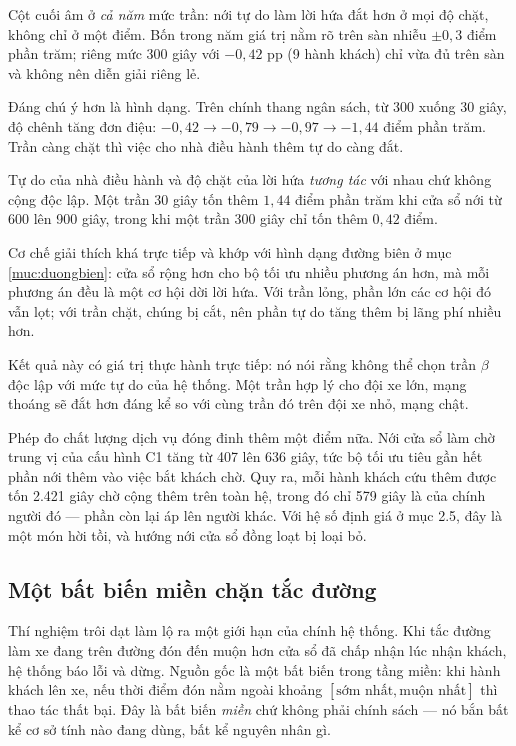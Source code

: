 Cột cuối âm ở \emph{cả năm} mức trần: nới tự do làm lời hứa đắt hơn ở mọi độ chặt, không chỉ ở
một điểm. Bốn trong năm giá trị nằm rõ trên sàn nhiễu $\pm 0{,}3$ điểm phần trăm; riêng mức
300 giây với $-0{,}42$ pp (9 hành khách) chỉ vừa đủ trên sàn và không nên diễn giải riêng lẻ.

Đáng chú ý hơn là hình dạng. Trên chính thang ngân sách, từ 300 xuống 30 giây, độ chênh tăng
đơn điệu: $-0{,}42 \to -0{,}79 \to -0{,}97 \to -1{,}44$ điểm phần trăm. Trần càng chặt thì việc
cho nhà điều hành thêm tự do càng đắt.

\begin{khungy}
Tự do của nhà điều hành và độ chặt của lời hứa \emph{tương tác} với nhau chứ không cộng độc
lập. Một trần 30 giây tốn thêm $1{,}44$ điểm phần trăm khi cửa sổ nới từ 600 lên 900 giây,
trong khi một trần 300 giây chỉ tốn thêm $0{,}42$ điểm.
\end{khungy}

Cơ chế giải thích khá trực tiếp và khớp với hình dạng đường biên ở mục \ref{muc:duongbien}: cửa sổ rộng hơn cho bộ tối ưu nhiều
phương án hơn, mà mỗi phương án đều là một cơ hội dời lời hứa. Với trần lỏng, phần lớn các cơ
hội đó vẫn lọt; với trần chặt, chúng bị cắt, nên phần tự do tăng thêm bị lãng phí nhiều hơn.

Kết quả này có giá trị thực hành trực tiếp: nó nói rằng không thể chọn trần $\beta$ độc lập với
mức tự do của hệ thống. Một trần hợp lý cho đội xe lớn, mạng thoáng sẽ đắt hơn đáng kể so với
cùng trần đó trên đội xe nhỏ, mạng chật.

Phép đo chất lượng dịch vụ đóng đinh thêm một điểm nữa. Nới cửa sổ làm chờ trung vị của cấu
hình C1 tăng từ 407 lên 636 giây, tức bộ tối ưu tiêu gần hết phần nới thêm vào việc bắt khách
chờ. Quy ra, mỗi hành khách cứu thêm được tốn 2.421 giây chờ cộng thêm trên toàn hệ, trong đó
chỉ 579 giây là của chính người đó --- phần còn lại áp lên người khác. Với hệ số định giá ở mục
2.5, đây là một món hời tồi, và hướng nới cửa sổ đồng loạt bị loại bỏ.

\subsection{Một bất biến miền chặn tắc đường}
\label{muc:batbien}

Thí nghiệm trôi dạt làm lộ ra một giới hạn của chính hệ thống. Khi tắc đường làm xe đang trên
đường đón đến muộn hơn cửa sổ đã chấp nhận lúc nhận khách, hệ thống báo lỗi và dừng. Nguồn gốc
là một bất biến trong tầng miền: khi hành khách lên xe, nếu thời điểm đón nằm ngoài khoảng
$[\text{sớm nhất}, \text{muộn nhất}]$ thì thao tác thất bại. Đây là bất biến \emph{miền} chứ
không phải chính sách --- nó bắn bất kể cơ sở tính nào đang dùng, bất kể nguyên nhân gì.

